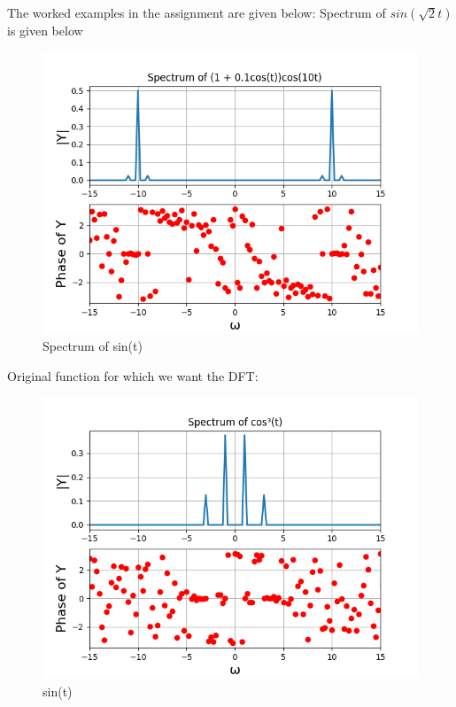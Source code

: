 \documentclass{article}
\begin{document}
The worked examples in the assignment are given below:
Spectrum of $sin(\sqrt{2}t)$ is given below\newline
\begin{figure}[h!]
\centering
\includegraphics[scale=0.6]{Figure_1.png}
\caption{Spectrum of sin(t)}
\label{fig:universe}
\end{figure}
\clearpage
Original function for which we want the DFT:
\begin{figure}[h!]
\centering
\includegraphics[scale=0.6]{Figure_2.png}
 \caption{sin(t)}
\label{fig:universe}
\end{figure}
\end{document}
